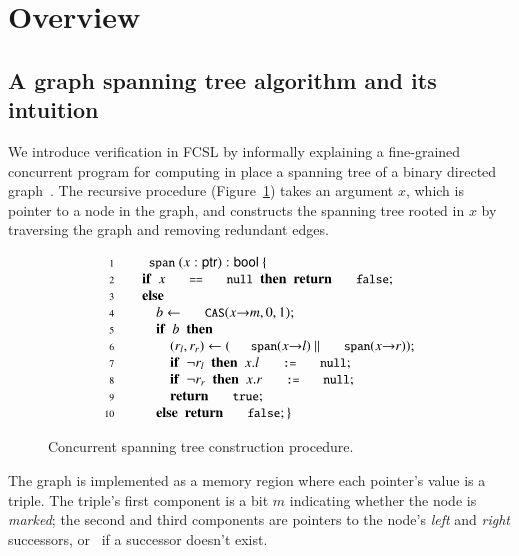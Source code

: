 
\section{Overview}
\label{sec:overview}

\subsection{A graph spanning tree algorithm and its intuition}
\label{sec:algorithm}
We introduce verification in FCSL by informally explaining a
fine-grained concurrent program for computing in place a spanning tree
of a binary directed
graph~\cite{Hobor-Villard:POPL13,Raad-al:colosl}. The recursive
procedure  (Figure~\ref{fig:span}) takes an argument $x$,
which is pointer to a node in the graph, and constructs the spanning
tree rooted in $x$ by traversing the graph and removing redundant
edges.


{
\setlength{\belowcaptionskip}{-10pt} 
\begin{figure}[t]
\centering
{\small{
\[ 
\begin{array}{rl}
\Num{1} & \esc{span}~(x : \tp{ptr}) : \tp{bool}~\{ 
\\ 
\Num{2} & ~~~~ \kw{if}~~x~\esc{==}~\esc{null}~~\kw{then}~~\kw{return}~\esc{false};    
\\
\Num{3} & ~~~~ \kw{else} \\
\Num{4} & ~~~~ ~~~~ b \Asgn \esc{CAS}(x{\rightarrow}m, 0, 1); \\ 
\Num{5} &~~~~  ~~~~ \kw{if}~~b~~\kw{then} \\
\Num{6} & ~~~~ ~~~~ ~~~~ (r_l, r_r) \Asgn(\esc{span}(x{\rightarrow}l)~||~\esc{span}(x{\rightarrow}r)); \\
\Num{7} & ~~~~ ~~~~ ~~~~ \kw{if}~~\neg{}r_l~~\kw{then}~~x.l~\esc{:=}~\esc{null};  \\
\Num{8} & ~~~~ ~~~~ ~~~~ \kw{if}~~\neg{}r_r~~\kw{then}~~x.r~\esc{:=}~\esc{null};  \\
\Num{9} & ~~~~ ~~~~ ~~~~ \kw{return}~\esc{true};\\
\Num{10} & ~~~~ ~~~~ \kw{else}~~\kw{return}~\esc{false}; \}
\end{array}
\]
}} 
\caption{Concurrent spanning tree construction procedure.}
\label{fig:span}
\end{figure} 
}

The graph is implemented as a memory region where each pointer's value
is a triple. The triple's first component is a bit $m$ indicating
whether the node is \emph{marked}; the second and third components are
pointers to the node's \emph{left} and \emph{right} successors,
or~ if a successor doesn't exist.

